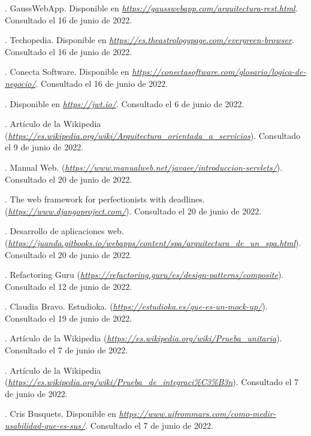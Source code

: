 \begin{thebibliography}{99}
. GaussWebApp. Disponible en {\it \url{https://gausswebapp.com/arquitectura-rest.html}}. Consultado el 16 de junio de 2022.

. Techopedia. Disponible en {\it \url{https://es.theastrologypage.com/evergreen-browser}}. Consultado el 16 de junio de 2022.

. Conecta Software. Disponible en {\it \url{https://conectasoftware.com/glosario/logica-de-negocio/}}. Consultado el 16 de junio de 2022.

. Disponible en {\it \url{https://jwt.io/}}. Consultado el 6 de junio de 2022.

. Artículo de la Wikipedia ({\it \url{https://es.wikipedia.org/wiki/Arquitectura_orientada_a_servicios}}). Consultado el 9 de junio de 2022.

. Manual Web. ({\it \url{https://www.manualweb.net/javaee/introduccion-servlets/}}). Consultado el 20 de junio de 2022.

. The web framework for perfectionists with deadlines. ({\it \url{https://www.djangoproject.com/}}). Consultado el 20 de junio de 2022.

. Desarrollo de aplicaciones web. ({\it \url{https://juanda.gitbooks.io/webapps/content/spa/arquitectura_de_un_spa.html}}). Consultado el 20 de junio de 2022.

. Refactoring Guru ({\it \url{https://refactoring.guru/es/design-patterns/composite}}). Consultado el 12 de junio de 2022.

. Claudia Bravo. Estudioka. ({\it \url{https://estudioka.es/que-es-un-mock-up/}}). Consultado el 19 de junio de 2022.

. Artículo de la Wikipedia ({\it \url{https://es.wikipedia.org/wiki/Prueba_unitaria}}). Consultado el 7 de junio de 2022.

. Artículo de la Wikipedia ({\it \url{https://es.wikipedia.org/wiki/Prueba_de_integraci%C3%B3n}}). Consultado el 7 de junio de 2022.

. Cris Busquets. Disponible en {\it \url{https://www.uifrommars.com/como-medir-usabilidad-que-es-sus/}}. Consultado el 7 de junio de 2022.


\end{thebibliography}
